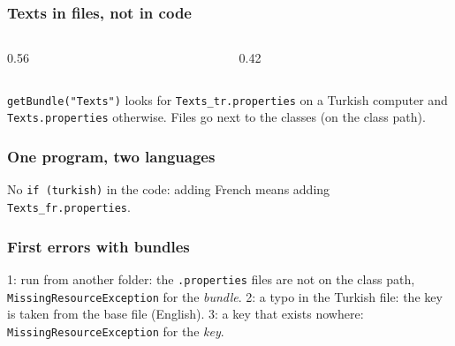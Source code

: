 \documentclass[aspectratio=169,10pt,compress]{beamer}
\begin{document}
\begin{frame}[t,fragile] \frametitle{Texts in files, not in code}
  \begin{columns}[T]
    \begin{column}{0.56\textwidth}
    \end{column}
    \begin{column}{0.42\textwidth}
    \end{column}
  \end{columns}
  \vspace{0.1em}
  \small \texttt{getBundle("Texts")} looks for \texttt{Texts\_tr.properties} on a Turkish computer and
  \texttt{Texts.properties} otherwise. Files go next to the classes (on the class path).
\end{frame}




\begin{frame}[t,fragile] \frametitle{One program, two languages}

  \vspace{0.1em}
  \small
  No \texttt{if (turkish)} in the code: adding French means adding \texttt{Texts\_fr.properties}.
\end{frame}




\begin{frame}[t,fragile] \frametitle{First errors with bundles}

  \vspace{0.1em}
  \small
  1: run from another folder: the \texttt{.properties} files are not on the class path, \texttt{MissingResourceException}
  for the \emph{bundle}. 2: a typo in the Turkish file: the key is taken from the base file (English).
  3: a key that exists nowhere: \texttt{MissingResourceException} for the \emph{key}.
\end{frame}
\end{document}
